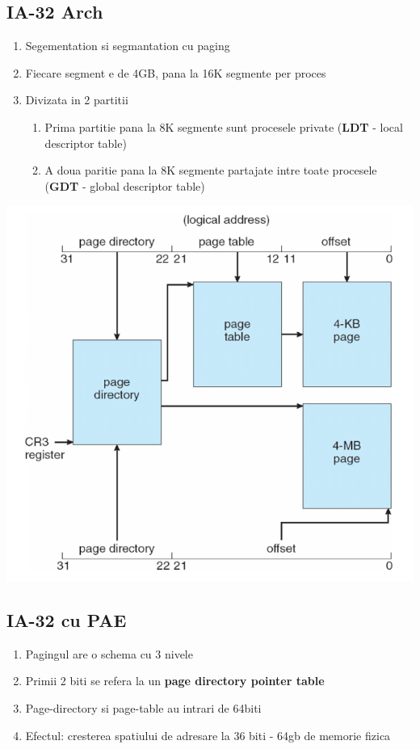\documentclass{article}
\begin{document}
\subsection*{IA-32 Arch}
\begin{enumerate}
    \item Segementation si segmantation cu paging
    \item Fiecare segment e de 4GB, pana la 16K segmente per proces
    \item Divizata in 2 partitii
          \begin{enumerate}
              \item Prima partitie pana la 8K segmente sunt procesele private (\textbf{LDT} - local descriptor table)
              \item A doua paritie pana la 8K segmente partajate intre toate procesele (\textbf{GDT} - global descriptor table)
          \end{enumerate}
\end{enumerate}
\begin{center}
    \includegraphics[scale=0.3]{27-32mem.png}
\end{center}

\subsection*{IA-32 cu PAE}
\begin{enumerate}
    \item Pagingul are o schema cu 3 nivele
    \item Primii 2 biti se refera la un \textbf{page directory pointer table}
    \item Page-directory si page-table au intrari de 64biti
    \item Efectul: cresterea spatiului de adresare la 36 biti - 64gb de memorie fizica
\end{enumerate}
\end{document}
